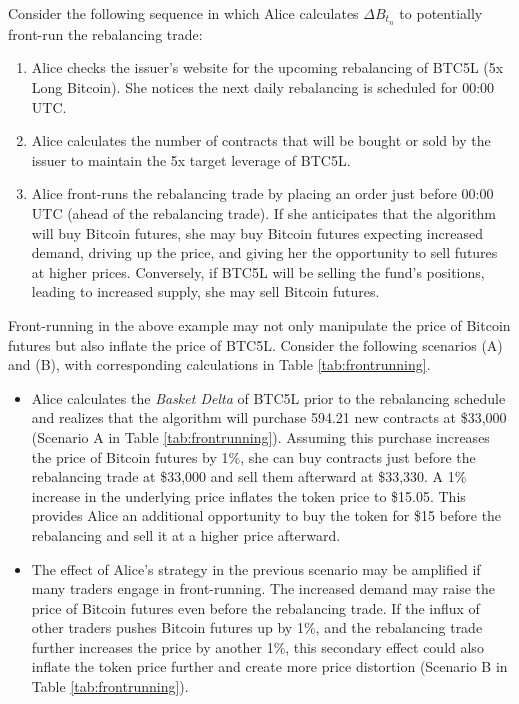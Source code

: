 
\begin{example}
	Consider the following sequence in which Alice calculates $\Delta{B_{t_{n}}}$ to potentially front-run the rebalancing trade:
	
	\begin{enumerate}
		\item Alice checks the issuer's website for the upcoming rebalancing of BTC5L (5x Long Bitcoin). She notices the next daily rebalancing is scheduled for 00:00 UTC.
		\item Alice calculates the number of contracts that will be bought or sold by the issuer to maintain the 5x target leverage of BTC5L.
		\item Alice front-runs the rebalancing trade by placing an order just before 00:00 UTC (ahead of the rebalancing trade). If she anticipates that the algorithm will buy Bitcoin futures, she may buy Bitcoin futures expecting increased demand, driving up the price, and giving her the opportunity to sell futures at higher prices. Conversely, if BTC5L will be selling the fund's positions, leading to increased supply, she may sell Bitcoin futures.
	\end{enumerate}
	Front-running in the above example may not only manipulate the price of Bitcoin futures but also inflate the price of BTC5L. Consider the following scenarios (A) and (B), with corresponding calculations in Table \ref{tab:frontrunning}.
	
	\begin{itemize}
		\item Alice calculates the \textsl{Basket Delta} of BTC5L prior to the rebalancing schedule and realizes that the algorithm will purchase 594.21 new contracts at \$33,000 (Scenario A in Table \ref{tab:frontrunning}). Assuming this purchase increases the price of Bitcoin futures by 1\%, she can buy contracts just before the rebalancing trade at \$33,000 and sell them afterward at \$33,330. A 1\% increase in the underlying price inflates the token price to \$15.05. This provides Alice an additional opportunity to buy the token for \$15 before the rebalancing and sell it at a higher price afterward.
		
		\item The effect of Alice's strategy in the previous scenario may be amplified if many traders engage in front-running. The increased demand may raise the price of Bitcoin futures even before the rebalancing trade. If the influx of other traders pushes Bitcoin futures up by 1\%, and the rebalancing trade further increases the price by another 1\%, this secondary effect could also inflate the token price further and create more price distortion (Scenario B in Table \ref{tab:frontrunning}).
	\end{itemize}
\end{example}

